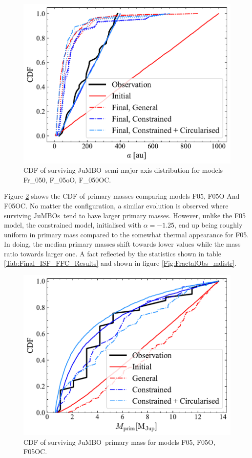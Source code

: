 \documentclass[submission,phys]{lib/SciPost}
\newcommand{\jumbo}{\mbox{JuMBO}}
\newcommand{\jumbos}{\mbox{JuMBOs}}
\begin{document}
\begin{figure}
    \centering
        \includegraphics[width=\columnwidth]{figures/Fractal_noFF_sem_axis.pdf}
     \caption{CDF of surviving \jumbo\, semi-major axis distribution
       for models Fr\_050, F\_05oO, F\_050OC.}
         \label{Fig:Semi_Fractal}
\end{figure}

Figure \ref{Fig:Fractal_mdistrCDF} shows the CDF of primary masses
comparing models F05, F05O And F05OC. No matter the configuration, a
similar evolution is observed where surviving \jumbos\, tend to have
larger primary masses. However, unlike the F05 model, the constrained
model, initialised with $\alpha = -1.25$, end up being roughly uniform
in primary mass compared to the somewhat thermal appearance for
F05. In doing, the median primary masses shift towards lower values
while the mass ratio towards larger one. A fact reflected by the
statistics shown in table \ref{Tab:Final_ISF_FFC_Results} and shown in
figure \ref{Fig:FractalObs_mdistr}.
    
   \begin{figure}
    \centering
        \includegraphics[width=\columnwidth]{figures/Fractal_noFF_mprim_vs_obs_.pdf}
        \caption{CDF of surviving \jumbo\, primary mass for models F05, F05O, F05OC.}
         \label{Fig:Fractal_mdistrCDF}
   \end{figure}
\end{document}

